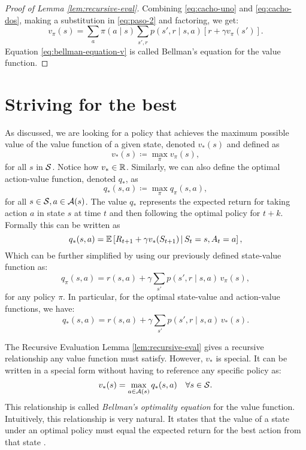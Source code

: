 \begin{proof}[Proof of Lemma \ref{lem:recursive-eval}]
	Combining \eqref{eq:cacho-uno} and \eqref{eq:cacho-dos}, making a substitution in \eqref{eq:paso-2} and factoring, we get:
	\begin{equation}
		\label{eq:bellman-equation-v}
		v_\pi (s) = \sum_a \pi(a \mid s) \sum_{s', r} p(s', r \mid s, a) \left[ r + \gamma v_\pi (s') \right].
	\end{equation}
Equation \eqref{eq:bellman-equation-v} is called Bellman's equation for the
value function.
\end{proof}

\section{Striving for the best}

As discussed, we are looking for a policy that achieves the maximum possible value
of the value function of a given state, denoted $v_*(s)$ and defined as
\[
	v_* (s) \coloneqq \max_{\pi} v_\pi (s),
\]
for all $s$ in $\mathcal{S}$. Notice how $v_* \in \mathbb{R}$. Similarly, we can also
define the optimal action-value function, denoted $q_*$, as
\[
	q_* (s, a) \coloneqq \max_{\pi} q_\pi (s, a),
\]
for all $s \in \mathcal{S}, a \in \mathcal{A}(s)$. The value $q_*$ represents the
expected return for taking action $a$ in state $s$ at time $t$ and then
following the optimal policy for $t+k$. Formally this can be written as
\[
	q_{*} (s, a) = \mathbb{E} \left[ R_{t+1} + \gamma v_* (S_{t+1}) \,\middle\vert\, S_t = s, A_t = a \right],
\]
Which can be further simplified by using our previously defined state-value function as:
\begin{equation}
	\label{eq:q-by-v}
	q_\pi (s, a) = r(s, a) + \gamma \sum_{s'} p(s', r \mid s, a) \, v_\pi (s),
\end{equation}
for any policy $\pi$. In particular, for the optimal state-value and action-value functions, we have:
\begin{equation}
	q_*	(s, a) = r(s, a) + \gamma \sum_{s'} p(s', r \mid s, a) \, v_* (s).
\end{equation}

The Recursive Evaluation Lemma \ref{lem:recursive-eval} gives a recursive
relationship any value function must satisfy. However, $v_*$ is special. It can
be written in a special form \cite{bellman1957,SuttonBarto,raoRL4F} without
having to reference any specific policy as:
\begin{equation}
	\label{eq:prop-dependencia-vq}
	v_* (s) = \max_{a \in \mathcal{A}(s)} q_* (s, a) \quad \forall s \in \mathcal{S}.
\end{equation}
This relationship is called \textit{Bellman's optimality equation} for the value
function. Intuitively, this relationship is very natural. It states that the
value of a state under an optimal policy must equal the expected return for the
best action from that state \cite[Ch.~3.6]{SuttonBarto}.

